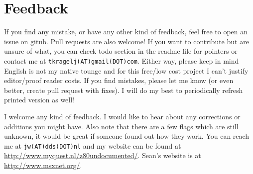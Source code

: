 \documentclass[twoside,openright,a4paper]{book}
\begin{document}
\section{Feedback}

\begin{description}[style=unboxed,leftmargin=0cm]

	\item[Tomaz]\hfill

	If you find any mistake, or have any other kind of feedback, feel free to open an issue on gitub. Pull requests are also welcome! If you want to contribute but are unsure of what, you can check todo section in the readme file for pointers or contact me at {\tt tkragelj(AT)gmail(DOT)com}. Either way, please keep in mind English is not my native tounge and for this free/low cost project I can't justify editor/proof reader costs. If you find mistakes, please let me know (or even better, create pull request with fixes). I will do my best to periodically refresh printed version as well!

	\item[Jan]\hfill
	
	I welcome any kind of feedback. I would like to hear about any corrections or additions you might have. Also note that there are a few flags which are still unknown, it would be great if someone found out how they work. You can reach me at {\tt jw(AT)dds(DOT)nl} and my website can be found at \url{http://www.myquest.nl/z80undocumented/}. Sean's website is at \url{http://www.msxnet.org/}.

\end{description}


\pagebreak
\end{document}
